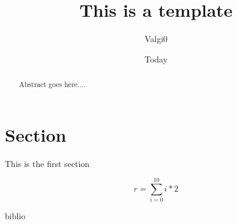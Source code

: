 \documentclass[12pt, twoside, a4paper, twocolumn] {article}
\begin{document}
\title{This is a template}
\author{Valgi0}
\date{Today}

\maketitle



\begin{abstract}
Abstract goes here....
\end{abstract}

\section{Section}
This is the first section
\cite{DBLP:conf/naacl/DevlinCLT19}

\begin{equation}
r = \sum_{i=0}^{10} i*2
\end{equation}

	

 {biblio}

\end{document}
